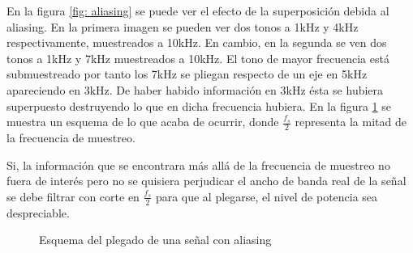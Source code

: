 En la figura \ref{fig: aliasing} se puede ver el efecto de la superposición debida al aliasing. En la primera imagen se pueden ver dos tonos a 1kHz y 4kHz respectivamente, muestreados a 10kHz. En cambio, en la segunda se ven dos tonos a 1kHz y 7kHz muestreados a 10kHz. El tono de mayor frecuencia está submuestreado por tanto los 7kHz se pliegan respecto de un eje en 5kHz apareciendo en 3kHz. De haber habido información en 3kHz ésta se hubiera superpuesto destruyendo lo que en dicha frecuencia hubiera. En la figura \ref{fig: aliasing_mirror} se muestra un esquema de lo que acaba de ocurrir, donde $\frac{f_s}{2}$ representa la mitad de la frecuencia de muestreo.

Si, la información que se encontrara más allá de la frecuencia de muestreo no fuera de interés pero no se quisiera perjudicar el ancho de banda real de la señal se debe filtrar con corte en $\frac{f_s}{2}$ para que al plegarse, el nivel de potencia sea despreciable.

\begin{figure}[ht!]
	\centering
	\caption{Esquema del plegado de una señal con aliasing}
	\label{fig: aliasing_mirror}
\end{figure}

